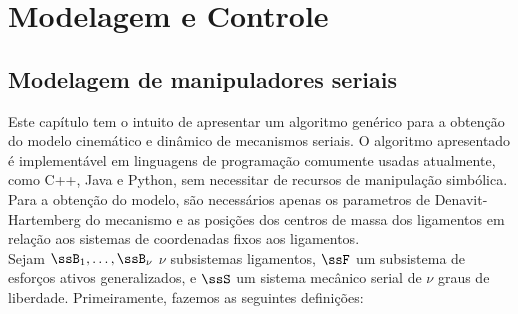 \documentclass[]{politex}
\begin{document}

\part{Modelagem e Controle}
	
\chapter{Modelagem de manipuladores seriais} \label{cap:Seriais}

Este capítulo tem o intuito de apresentar um algoritmo genérico para a obtenção do modelo cinemático e dinâmico de mecanismos seriais. O algoritmo apresentado é implementável em linguagens de programação comumente usadas atualmente, como C++, Java e Python, sem necessitar de recursos de manipulação simbólica. \\
Para a obtenção do modelo, são necessários apenas os parametros de Denavit-Hartemberg \cite{Craig, Denavit, Lipkin, Cabral} do mecanismo e as posições dos centros de massa dos ligamentos em relação aos sistemas de coordenadas fixos aos ligamentos. \\ 

Sejam $\ssB_1,\hdots,\ssB_\nu$ $\nu$ subsistemas ligamentos, $\ssF$ um subsistema de esforços ativos generalizados, e $\ssS$ um sistema mecânico serial de $\nu$ graus de liberdade. Primeiramente, fazemos as seguintes definições:
\end{document}
